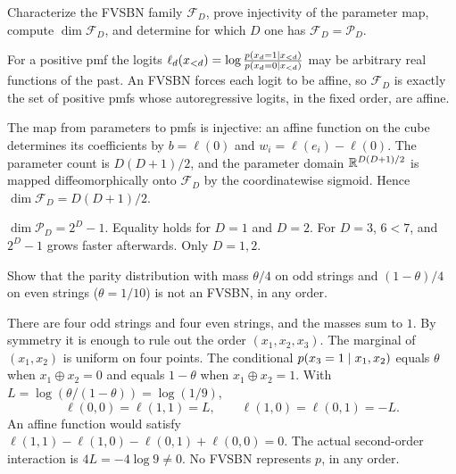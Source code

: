 \begin{hwqbox}
Characterize the FVSBN family $\mathcal F_D$, prove injectivity of the parameter map, compute $\dim\mathcal F_D$, and determine for which $D$ one has $\mathcal F_D=\mathcal P_D$.
\end{hwqbox}
\begin{hwsolbox}
For a positive pmf the logits $\ell_d(x_{<d})=\log\frac{p(x_d=1\mid x_{<d})}{p(x_d=0\mid x_{<d})}$ may be arbitrary real functions of the past. An FVSBN forces each logit to be affine, so $\mathcal F_D$ is exactly the set of positive pmfs whose autoregressive logits, in the fixed order, are affine.

The map from parameters to pmfs is injective: an affine function on the cube determines its coefficients by $b=\ell(0)$ and $w_i=\ell(e_i)-\ell(0)$. The parameter count is $D(D+1)/2$, and the parameter domain $\mathbb{R}^{D(D+1)/2}$ is mapped diffeomorphically onto $\mathcal F_D$ by the coordinatewise sigmoid. Hence $\dim\mathcal F_D=D(D+1)/2$.

$\dim\mathcal P_D=2^D-1$. Equality holds for $D=1$ and $D=2$. For $D=3$, $6<7$, and $2^D-1$ grows faster afterwards. Only $D=1,2$.
\end{hwsolbox}

\begin{hwqbox}
Show that the parity distribution with mass $\theta/4$ on odd strings and $(1-\theta)/4$ on even strings ($\theta=1/10$) is not an FVSBN, in any order.
\end{hwqbox}
\begin{hwsolbox}
There are four odd strings and four even strings, and the masses sum to $1$. By symmetry it is enough to rule out the order $(x_1,x_2,x_3)$. The marginal of $(x_1,x_2)$ is uniform on four points. The conditional $p(x_3=1\mid x_1,x_2)$ equals $\theta$ when $x_1\oplus x_2=0$ and equals $1-\theta$ when $x_1\oplus x_2=1$. With $L=\log(\theta/(1-\theta))=\log(1/9)$,
\[
\ell(0,0)=\ell(1,1)=L,\qquad \ell(1,0)=\ell(0,1)=-L.
\]
An affine function would satisfy $\ell(1,1)-\ell(1,0)-\ell(0,1)+\ell(0,0)=0$. The actual second-order interaction is $4L=-4\log 9\ne 0$. No FVSBN represents $p$, in any order.
\end{hwsolbox}

